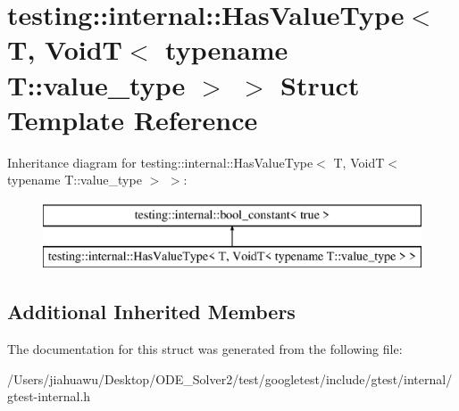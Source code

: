 \hypertarget{structtesting_1_1internal_1_1_has_value_type_3_01_t_00_01_void_t_3_01typename_01_t_1_1value__type_01_4_01_4}{}\section{testing\+:\+:internal\+:\+:Has\+Value\+Type$<$ T, VoidT$<$ typename T\+:\+:value\+\_\+type $>$ $>$ Struct Template Reference}
\label{structtesting_1_1internal_1_1_has_value_type_3_01_t_00_01_void_t_3_01typename_01_t_1_1value__type_01_4_01_4}
Inheritance diagram for testing\+:\+:internal\+:\+:Has\+Value\+Type$<$ T, VoidT$<$ typename T\+:\+:value\+\_\+type $>$ $>$\+:\begin{figure}[H]
\begin{center}
\leavevmode
\includegraphics[height=2.000000cm]{structtesting_1_1internal_1_1_has_value_type_3_01_t_00_01_void_t_3_01typename_01_t_1_1value__type_01_4_01_4}
\end{center}
\end{figure}
\subsection*{Additional Inherited Members}


The documentation for this struct was generated from the following file\+:\begin{DoxyCompactItemize}
\item 
/\+Users/jiahuawu/\+Desktop/\+O\+D\+E\+\_\+\+Solver2/test/googletest/include/gtest/internal/gtest-\/internal.\+h\end{DoxyCompactItemize}
